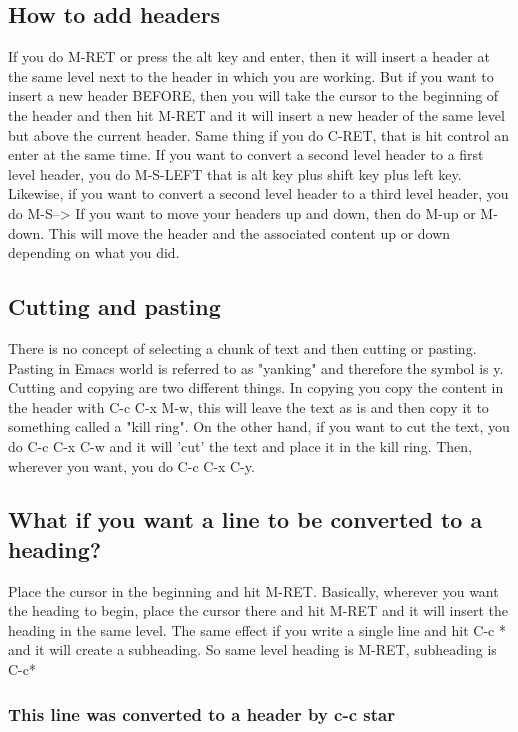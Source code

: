 \documentclass[11pt]{article}
\begin{document}
\subsection{How to add headers}
\label{sec:org9e001b0}
If you do M-RET or press the alt key and enter, then it will insert a header at the same level next to the header in which you are working. But if you want to insert a new header BEFORE, then you will take the cursor to the beginning of the header and then hit M-RET and it will insert a new header of the same level but above the current header. Same thing if you do C-RET, that is hit control an enter at the same time.
If you want to convert a second level header to a first level header, you do M-S-LEFT that is alt key plus shift key plus left key. Likewise, if you want to convert a second level header to a third level header, you do M-S-->
If you want to move your headers up and down, then do M-up or M-down. This will move the header and the associated content up or down depending on what you did.


\subsection{Cutting and pasting}
\label{sec:org5523b4a}
There is no concept of selecting a chunk of text and then cutting or pasting. Pasting in Emacs world is referred to as "yanking" and therefore the symbol is y. Cutting and copying are two different things. In copying you copy the content in the header with C-c C-x M-w, this will leave the text as is and then copy it to something called a "kill ring". On the other hand, if you want to cut the text, you do C-c C-x C-w and it will 'cut' the text and place it in the kill ring. Then, wherever you want, you do C-c C-x C-y. 


\subsection{What if you want a line to be converted to a heading?}
\label{sec:org8c30446}
Place the cursor in the beginning and hit M-RET. Basically, wherever you want the heading to begin, place the cursor there and hit M-RET and it will insert the heading in the same level. The same effect if you write a single line and hit C-c * and it will create a subheading. So same level heading is M-RET, subheading is C-c* 

\subsubsection{This line was converted to a header by c-c star}
\label{sec:orgc7d08e2}
\end{document}
